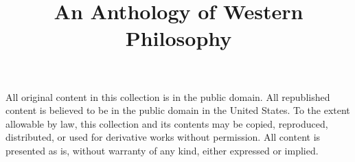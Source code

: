 \documentclass[11pt,openany,twoside]{book}
\begin{document}
\title{An Anthology of Western Philosophy}

\frontmatter
\maketitle
\thispagestyle{empty}
\leavevmode\vfil
\begin{center}
\printversion
\vspace{1\baselineskip}

\noindent\parbox{0.7\columnwidth}{\footnotesize All original content
in this collection is in the public domain. All republished content is
believed to be in the public domain in the United States. To the
extent allowable by law, this collection and its contents may be
copied, reproduced, distributed, or used for derivative works without
permission. All content is presented as is, without warranty of any
kind, either expressed or implied.}

\end{center}
\vfil\vfil\leavevmode
\tableofcontents
\mainmatter
\end{document}
